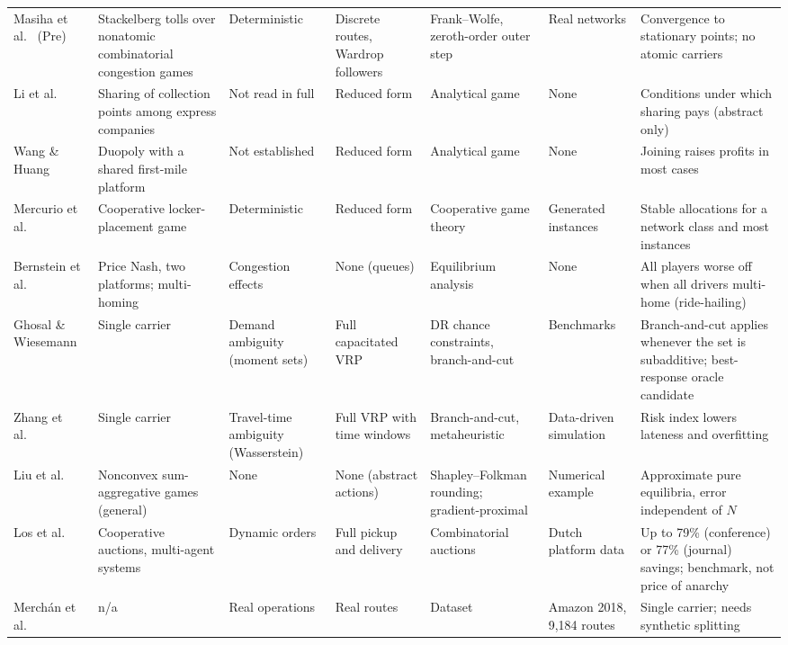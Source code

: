 \documentclass[preprint,12pt]{elsarticle}
\begin{document}
\begin{landscape}
{\begin{longtable}{@{}L{3.3cm}L{3.3cm}L{2.6cm}L{2.6cm}L{3cm}L{2.2cm}L{4.1cm}@{}}
Masiha et al.\ \cite{Masiha2026} (Pre) & Stackelberg tolls over nonatomic combinatorial congestion games & Deterministic & Discrete routes, Wardrop followers & Frank--Wolfe, zeroth-order outer step & Real networks & Convergence to stationary points; no atomic carriers\\
Li et al.\ \cite{Li2024} & Sharing of collection points among express companies & Not read in full & Reduced form & Analytical game & None & Conditions under which sharing pays (abstract only)\\
Wang \& Huang \cite{WangHuang2021} & Duopoly with a shared first-mile platform & Not established & Reduced form & Analytical game & None & Joining raises profits in most cases\\
Mercurio et al.\ \cite{Mercurio2026} & Cooperative locker-placement game & Deterministic & Reduced form & Cooperative game theory & Generated instances & Stable allocations for a network class and most instances\\
Bernstein et al.\ \cite{Bernstein2021} & Price Nash, two platforms; multi-homing & Congestion effects & None (queues) & Equilibrium analysis & None & All players worse off when all drivers multi-home (ride-hailing)\\
Ghosal \& Wiesemann \cite{GhosalWiesemann2020} & Single carrier & Demand ambiguity (moment sets) & Full capacitated VRP & DR chance constraints, branch-and-cut & Benchmarks & Branch-and-cut applies whenever the set is subadditive; best-response oracle candidate\\
Zhang et al.\ \cite{Zhang2021} & Single carrier & Travel-time ambiguity (Wasserstein) & Full VRP with time windows & Branch-and-cut, metaheuristic & Data-driven simulation & Risk index lowers lateness and overfitting\\
Liu et al.\ \cite{Liu2023} & Nonconvex sum-aggregative games (general) & None & None (abstract actions) & Shapley--Folkman rounding; gradient-proximal & Numerical example & Approximate pure equilibria, error independent of $N$\\
Los et al.\ \cite{Los2020iccl,Los2025} & Cooperative auctions, multi-agent systems & Dynamic orders & Full pickup and delivery & Combinatorial auctions & Dutch platform data & Up to 79\% (conference) or 77\% (journal) savings; benchmark, not price of anarchy\\
Merch{\'a}n et al.\ \cite{Merchan2024} & n/a & Real operations & Real routes & Dataset & Amazon 2018, 9,184 routes & Single carrier; needs synthetic splitting\\
\end{longtable}}
\end{landscape}
\end{document}
